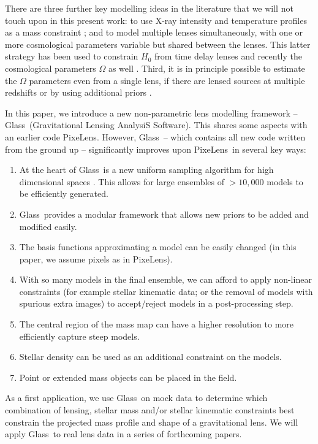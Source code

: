 \documentclass[galley,usenatbib]{mn2e}
\newcommand{\Glass}{{\sc Glass}}
\newcommand{\PixeLens}{{\sc PixeLens}}
\begin{document}
There are three further key modelling ideas in the literature that we will not
touch upon in this present work: to use X-ray intensity and temperature
profiles as a mass constraint \citep[e.g.][]{2013ApJ...765...25N}; and to model
multiple lenses simultaneously, with one or more cosmological parameters
variable but shared between the lenses. This latter strategy has been used to
constrain $H_0$ from time delay lenses
\citep{2006ApJ...652L...5S,2008ApJ...679...17C,2010ApJ...712.1378P} and
recently the cosmological parameters $\Omega$ as well
\citep{2014MNRAS.437..600S}.  Third, it is in principle possible to estimate
the $\Omega$ parameters even from a single lens, if there are lensed sources at
multiple redshifts \citep{2014MNRAS.437.2461L} or by using additional priors 
\citep{2010Sci...329..924J,2013arXiv1306.4732S}.

In this paper, we introduce a new non-parametric lens modelling framework  --
\Glass\ (Gravitational Lensing AnalysiS Software). This shares some aspects
with an earlier code \PixeLens \citep{Saha2004,2008ApJ...679...17C}. However,
\Glass\ -- which contains all new code written from the ground up --
significantly improves upon \PixeLens\ in several key ways: 

\begin{enumerate}
\item At the heart of \Glass\ is a new uniform sampling algorithm for high
    dimensional spaces \citep{2012MNRAS.425.3077L}. This allows for large
    ensembles of $>10,000$ models to be efficiently generated. 
\item \Glass\ provides a modular framework that allows new priors to be added
    and modified easily.
\item The basis functions approximating a model can be easily changed (in this
    paper, we assume pixels as in \PixeLens). 
\item With so many models in the final ensemble, we can afford to apply
    non-linear constraints (for example stellar kinematic data; or the removal of
    models with spurious extra images) to accept/reject models in a post-processing
    step.
\item The central region of the mass map can have a higher resolution to more
    efficiently capture steep models.
\item Stellar density can be used as an additional constraint on the models. 
\item Point or extended mass objects can be placed in the field.
\end{enumerate}
%
As a first application, we use \Glass\ on mock data to determine which
combination of lensing, stellar mass and/or stellar kinematic constraints best
constrain the projected mass profile and shape of a gravitational lens. We will
apply \Glass\ to real lens data in a series of forthcoming papers. 
\end{document}

